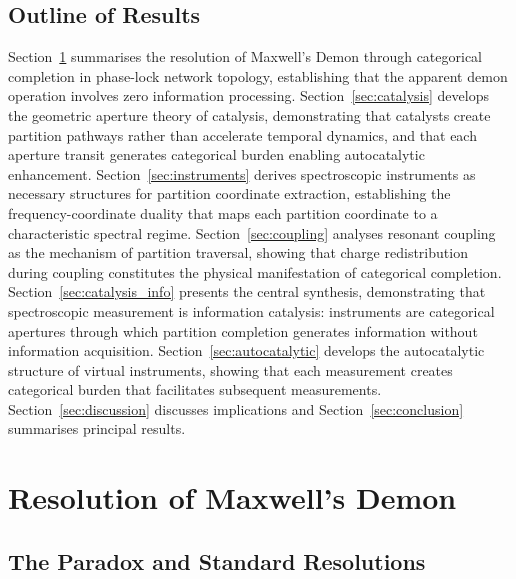 \documentclass[twocolumn,10pt,a4paper]{article}
\theoremstyle{definition}
\theoremstyle{remark}
\begin{document}
\subsection{Outline of Results}

Section~\ref{sec:demon} summarises the resolution of Maxwell's Demon through categorical completion in phase-lock network topology, establishing that the apparent demon operation involves zero information processing. Section~\ref{sec:catalysis} develops the geometric aperture theory of catalysis, demonstrating that catalysts create partition pathways rather than accelerate temporal dynamics, and that each aperture transit generates categorical burden enabling autocatalytic enhancement. Section~\ref{sec:instruments} derives spectroscopic instruments as necessary structures for partition coordinate extraction, establishing the frequency-coordinate duality that maps each partition coordinate to a characteristic spectral regime. Section~\ref{sec:coupling} analyses resonant coupling as the mechanism of partition traversal, showing that charge redistribution during coupling constitutes the physical manifestation of categorical completion. Section~\ref{sec:catalysis_info} presents the central synthesis, demonstrating that spectroscopic measurement is information catalysis: instruments are categorical apertures through which partition completion generates information without information acquisition. Section~\ref{sec:autocatalytic} develops the autocatalytic structure of virtual instruments, showing that each measurement creates categorical burden that facilitates subsequent measurements. Section~\ref{sec:discussion} discusses implications and Section~\ref{sec:conclusion} summarises principal results.


\section{Resolution of Maxwell's Demon}
\label{sec:demon}

\subsection{The Paradox and Standard Resolutions}
\end{document}
